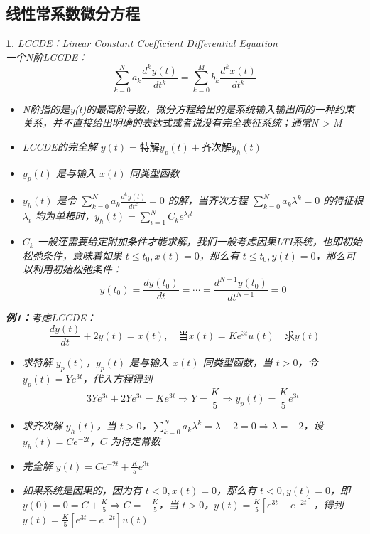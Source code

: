 \documentclass[UTF8]{report}
\theoremstyle{MyLineTheoremStyle} %
\theoremstyle{MyBlockTheoremStyle} %
\theoremstyle{MySubsubsectionStyle} %
\newtheorem{definition}{}
\begin{document}
    \subsection{\textbf{线性常系数微分方程}}
\begin{definition}
    LCCDE：Linear Constant Coefficient Differential Equation\\
    一个N阶LCCDE：
    \[
    \sum_{k=0}^{N} a_k \frac{d^k y(t)}{dt^k} = \sum_{k=0}^{M} b_k \frac{d^k x(t)}{dt^k}
    \]
    \begin{itemize}
        \item N阶指的是y(t)的最高阶导数，微分方程给出的是系统输入输出间的一种约束关系，并不直接给出明确的表达式或者说没有完全表征系统；通常N > M
        \item LCCDE的完全解 $y(t) = \text{特解}y_p(t) + \text{齐次解}y_h(t)$
        \item $y_p(t)$ 是与输入 $x(t)$ 同类型函数
        \item $y_h(t)$ 是令 $\sum_{k=0}^{N} a_k \frac{d^k y(t)}{dt^k} = 0$ 的解，当齐次方程 $\sum_{k=0}^{N} a_k \lambda^k = 0$ 的特征根 $\lambda_i$ 均为单根时，$y_h(t) = \sum_{i=1}^{N} C_k e^{\lambda_i t}$
        \item $C_k$ 一般还需要给定附加条件才能求解，我们一般考虑因果LTI系统，也即初始松弛条件，意味着如果 $t \leq t_0, x(t) = 0$，那么有 $t \leq t_0, y(t) = 0$，那么可以利用初始松弛条件：
        \[
        y(t_0) = \frac{dy(t_0)}{dt} = \cdots = \frac{d^{N-1} y(t_0)}{dt^{N-1}} = 0
        \]
    \end{itemize}

    \textbf{例1：}考虑LCCDE：
    \[
    \frac{dy(t)}{dt} + 2y(t) = x(t), \quad \text{当} x(t) = K e^{3t} u(t) \quad \text{求} y(t)
    \]
    \begin{itemize}
        \item 求特解 $y_p(t)$，$y_p(t)$ 是与输入 $x(t)$ 同类型函数，当 $t > 0$，令 $y_p(t) = Y e^{3t}$，代入方程得到
        \[
        3Y e^{3t} + 2Y e^{3t} = K e^{3t} \Rightarrow Y = \frac{K}{5} \Rightarrow y_p(t) = \frac{K}{5} e^{3t}
        \]
        \item 求齐次解 $y_h(t)$，当 $t > 0$，$\sum_{k=0}^{N} a_k \lambda^k = \lambda + 2 = 0 \Rightarrow \lambda = -2$，设 $y_h(t) = C e^{-2t}$，$C$ 为待定常数
        \item 完全解 $y(t) = C e^{-2t} + \frac{K}{5} e^{3t}$
        \item 如果系统是因果的，因为有 $t < 0, x(t) = 0$，那么有 $t < 0, y(t) = 0$，即 $y(0) = 0 = C + \frac{K}{5} \Rightarrow C = -\frac{K}{5}$，当 $t > 0$，$y(t) = \frac{K}{5} [e^{3t} - e^{-2t}]$，得到 $y(t) = \frac{K}{5} [e^{3t} - e^{-2t}] u(t)$
    \end{itemize}


\end{definition}
\end{document}
